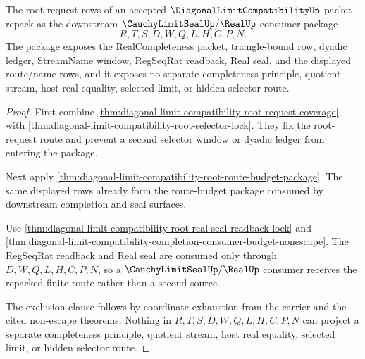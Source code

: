 \begin{theorem}
\label{thm:diagonal-limit-compatibility-root-seal-package}
The root-request rows of an accepted $\DiagonalLimitCompatibilityUp$ packet repack as the downstream $\CauchyLimitSealUp/\RealUp$ consumer package
$$
R,T,S,D,W,Q,L,H,C,P,N .
$$
The package exposes the RealCompleteness packet, triangle-bound row, dyadic ledger, StreamName window, RegSeqRat readback, Real seal, and the displayed route/name rows, and it exposes no separate completeness principle, quotient stream, host real equality, selected limit, or hidden selector route.
\end{theorem}
\begin{proof}
First combine \autoref{thm:diagonal-limit-compatibility-root-request-coverage} with \autoref{thm:diagonal-limit-compatibility-root-selector-lock}. They fix the root-request route and prevent a second selector window or dyadic ledger from entering the package.

Next apply \autoref{thm:diagonal-limit-compatibility-root-route-budget-package}. The same displayed rows already form the route-budget package consumed by downstream completion and seal surfaces.

Use \autoref{thm:diagonal-limit-compatibility-root-real-seal-readback-lock} and \autoref{thm:diagonal-limit-compatibility-completion-consumer-budget-nonescape}. The RegSeqRat readback and Real seal are consumed only through $D,W,Q,L,H,C,P,N$, so a $\CauchyLimitSealUp/\RealUp$ consumer receives the repacked finite route rather than a second source.

The exclusion clause follows by coordinate exhaustion from the carrier and the cited non-escape theorems. Nothing in $R,T,S,D,W,Q,L,H,C,P,N$ can project a separate completeness principle, quotient stream, host real equality, selected limit, or hidden selector route.
\end{proof}

